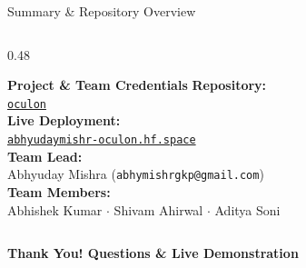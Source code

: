 \documentclass[aspectratio=169,10pt]{beamer}
\begin{document}
\begin{frame}{Summary \& Repository Overview}
\begin{columns}[T]
    \begin{column}{0.48\textwidth}
      \begin{exampleblock}{\textbf{Project \& Team Credentials}}
        \footnotesize
        \textbf{Repository:} \\
        \href{https://github.com/abhyudaymishr/oculon}{\small \texttt{oculon}} \\
        \vspace{0.1cm}
        \textbf{Live Deployment:} \\
        \href{https://abhyudaymishr-oculon.hf.space}{\small \texttt{abhyudaymishr-oculon.hf.space}} \\
        \vspace{0.2cm}
        \textbf{Team Lead:} \\
        Abhyuday Mishra (\texttt{abhymishrgkp@gmail.com}) \\
        \textbf{Team Members:} \\
        Abhishek Kumar $\cdot$ Shivam Ahirwal $\cdot$ Aditya Soni
      \end{exampleblock}
    \end{column}
  \end{columns}

  \vspace{0.3cm}
  \begin{center}
    \Large \textbf{Thank You! Questions \& Live Demonstration}
  \end{center}
\end{frame}
\end{document}
